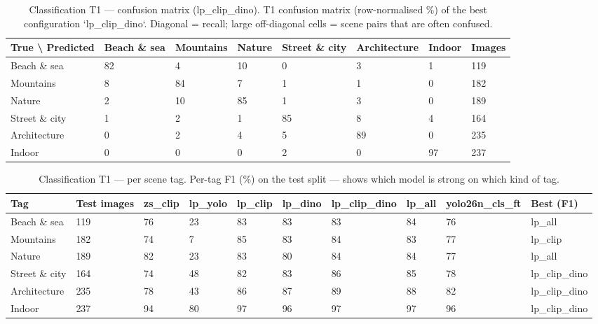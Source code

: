 \begin{table}[ht]
\centering
\small
\caption{Classification T1 — confusion matrix (lp\_clip\_dino). T1 confusion matrix (row-normalised \%) of the best configuration `lp\_clip\_dino`. Diagonal = recall; large off-diagonal cells = scene pairs that are often confused.}
\begin{tabular}{llllllll}
\toprule
True \textbackslash{} Predicted & Beach \& sea & Mountains & Nature & Street \& city & Architecture & Indoor & Images \\
\midrule
Beach \& sea & 82 & 4 & 10 & 0 & 3 & 1 & 119 \\
Mountains & 8 & 84 & 7 & 1 & 1 & 0 & 182 \\
Nature & 2 & 10 & 85 & 1 & 3 & 0 & 189 \\
Street \& city & 1 & 2 & 1 & 85 & 8 & 4 & 164 \\
Architecture & 0 & 2 & 4 & 5 & 89 & 0 & 235 \\
Indoor & 0 & 0 & 0 & 2 & 0 & 97 & 237 \\
\bottomrule
\end{tabular}
\end{table}

\begin{table}[ht]
\centering
\small
\caption{Classification T1 — per scene tag. Per-tag F1 (\%) on the test split — shows which model is strong on which kind of tag.}
\begin{tabular}{llllllllll}
\toprule
Tag & Test images & zs\_clip & lp\_yolo & lp\_clip & lp\_dino & lp\_clip\_dino & lp\_all & yolo26n\_cls\_ft & Best (F1) \\
\midrule
Beach \& sea & 119 & 76 & 23 & 83 & 83 & 83 & 84 & 76 & lp\_all \\
Mountains & 182 & 74 & 7 & 85 & 83 & 84 & 83 & 77 & lp\_clip \\
Nature & 189 & 82 & 23 & 83 & 80 & 84 & 84 & 77 & lp\_all \\
Street \& city & 164 & 74 & 48 & 82 & 83 & 86 & 85 & 78 & lp\_clip\_dino \\
Architecture & 235 & 78 & 43 & 86 & 87 & 89 & 88 & 82 & lp\_clip\_dino \\
Indoor & 237 & 94 & 80 & 97 & 96 & 97 & 97 & 96 & lp\_clip\_dino \\
\bottomrule
\end{tabular}
\end{table}

